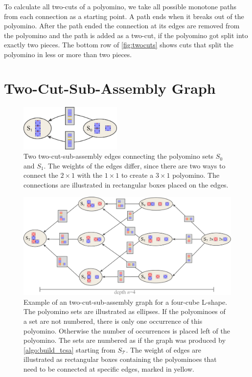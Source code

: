 To calculate all two-cuts of a polyomino, we take all possible monotone paths from each connection as a starting point.
A path ends when it breaks out of the polyomino.
After the path ended the connection at its edges are removed from the polyomino and the path is added as a two-cut, if the polyomino got split into exactly two pieces.
The bottom row of \autoref{fig:twocuts} shows cuts that split the polyomino in less or more than two pieces.


\section{Two-Cut-Sub-Assembly Graph}
\label{sec:tcsa}

\begin{figure}
	\centering
	\includegraphics[width=0.45\textwidth]{figures/tcsa_multiedge.pdf}
	\caption[Two two-cut-sub-assembly nodes connected with multiple edges.]{Two two-cut-sub-assembly edges connecting the polyomino sets $S_0$ and $S_1$. The weights of the edges differ, since there are two ways to connect the $2\times1$ with the $1\times1$ to create a $3\times1$ polyomino. The connections are illustrated in rectangular boxes placed on the edges.}
	\label{fig:tcsa_multiedge}
\end{figure}

\begin{figure}
	\centering
	\includegraphics[width=1\textwidth]{figures/tcsa.pdf}
	\caption[Example for a two-cut-sub-assembly graph.]{Example of an two-cut-sub-assembly graph for a four-cube L-shape. The polyomino sets are illustrated as ellipses. If the polyominoes of a set are not numbered, there is only one occurrence of this polyomino. Otherwise the number of occurrences is placed left of the polyomino. The sets are numbered as if the graph was produced by \autoref{algo:build_tcsa} starting from $S_\mathcal{T}$. The weight of edges are illustrated as rectangular boxes containing the polyominoes that need to be connected at specific edges, marked in yellow.}
	\label{fig:tcsa}
\end{figure}

